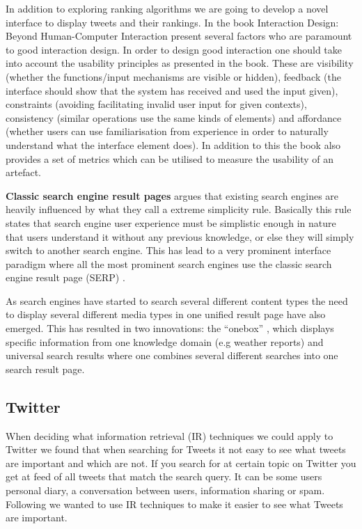 In addition to exploring ranking algorithms we are going to develop a novel interface to display tweets and their rankings. In the book Interaction Design: Beyond Human-Computer Interaction \citet{Sharp2007} present several factors who are paramount to good interaction design. In order to design good interaction one should take into account the usability principles as presented in the book. These are visibility (whether the functions/input mechanisms are visible or hidden), feedback (the interface should show that the system has received and used the input given), constraints (avoiding facilitating invalid user input for given contexts), consistency (similar operations use the same kinds of elements) and affordance (whether users can use familiarisation from experience in order to naturally understand what the interface element does). In addition to this the book also provides a set of metrics which can be utilised to measure the usability of an artefact.\newline

{\bf \noindent Classic search engine result pages}\newline
\citet[p.480]{Baeza-Yates2010b} argues that existing search engines are heavily influenced by what they call a extreme simplicity rule. Basically this rule states that search engine user experience must be simplistic enough in nature that users understand it without any previous knowledge, or else they will simply switch to another search engine. This has lead to a very prominent interface paradigm where all the most prominent search engines use the classic search engine result page (SERP) \citep{Baeza-Yates2010b}. 

As search engines have started to search several different content types the need to display several different media types in one unified result page have also emerged. This has resulted in two innovations: the “onebox” \citep{Baeza-Yates2010b}, which displays specific information from one knowledge domain (e.g weather reports) and universal search results where one combines several different searches into one search result page.

\subsection{Twitter}
\label{Twitter}
When deciding what information retrieval (IR) techniques we could apply to Twitter we found that when searching for Tweets it not easy to see what tweets are important and which are not. If you search for at certain topic on Twitter you get at feed of all tweets that match the search query. It can be some users personal diary, a conversation between users, information sharing or spam. Following we wanted to use IR techniques to make it easier to see what Tweets are important. 

